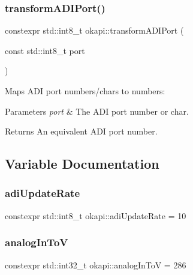 \subsubsection{\texorpdfstring{transformADIPort()}{transformADIPort()}}
{\footnotesize\ttfamily constexpr std\+::int8\+\_\+t okapi\+::transform\+A\+D\+I\+Port (\begin{DoxyParamCaption}\item[{const std\+::int8\+\_\+t}]{port }\end{DoxyParamCaption})}

Maps A\+DI port numbers/chars to numbers\+: 
\begin{DoxyCode}{0}
\DoxyCodeLine{  \textcolor{keywordflow}{else} -> [1, 8]}
\DoxyCodeLine{\}}
\end{DoxyCode}



\begin{DoxyParams}{Parameters}
{\em port} & The A\+DI port number or char. \\
\hline
\end{DoxyParams}
\begin{DoxyReturn}{Returns}
An equivalent A\+DI port number. 
\end{DoxyReturn}


\subsection{Variable Documentation}
\mbox{\label{namespaceokapi_abf765c88ac34df87d378fb66ea5fd20c}} 
\subsubsection{\texorpdfstring{adiUpdateRate}{adiUpdateRate}}
{\footnotesize\ttfamily constexpr std\+::int8\+\_\+t okapi\+::adi\+Update\+Rate = 10\hspace{0.3cm}{\ttfamily [static]}}

\mbox{\label{namespaceokapi_a2a1dadedbf4a0243e7671614e7664eb0}} 
\subsubsection{\texorpdfstring{analogInToV}{analogInToV}}
{\footnotesize\ttfamily constexpr std\+::int32\+\_\+t okapi\+::analog\+In\+ToV = 286\hspace{0.3cm}{\ttfamily [static]}}

